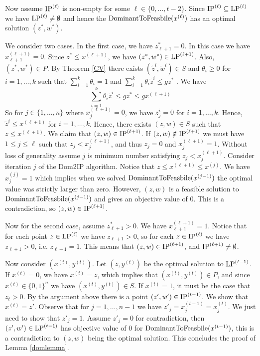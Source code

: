 	Now assume $\operatorname{IP}^{(\ell)}$ is non-empty for some $\ell \in \{0,\ldots,t-2\}$. Since $\operatorname{IP}^{(\ell)}\subseteq\operatorname{LP}^{(\ell)}$ we have $\operatorname{LP}^{(\ell)}\neq \emptyset$ and hence the $\operatorname{DominantToFeasbile}(x^{(\ell)})$ has an optimal solution $(z^*,w^*)$. 
	
	We consider two cases. In the first case, we have $z^*_{\ell+1}=0$. In this case we have $x^{(\ell+1)}_{\ell+1}=0$. Since $z^*\leq x^{(\ell+1)}$, we have $(z^*,w^*)\in \operatorname{LP}^{(\ell+1)}$. Also, $(z^*,w^*)\in P$. By Theorem \ref{CV} there exists $(\tilde{z}^i,\tilde{w}^i)\in S$ and $\theta_i\geq 0$ for $i=1,\ldots,k$ such that $\sum_{i=1}^{k} \theta_i = 1$ and  $\sum_{i=1}^{k}\theta_i \tilde{z}^i \leq gz^*$ . We have
	\begin{equation}
	\sum_{i=1}^{k}\theta_i \tilde{z}^i \leq gz^*\leq gx^{(\ell+1)}
	\end{equation}
	So for $j\in \{1,\ldots,n\}$ where $x^{(\ell+1)}_j=0$, we have $z^i_j=0$ for $i=1,\ldots,k$. Hence, $\tilde{z}^i\leq x^{(\ell+1)}$ for $i=1,\ldots,k$. Hence, there exists $(z,w)\in S$ such that $z\leq x^{(\ell+1)}$. We claim that $(z,w)\in \operatorname{IP}^{(\ell+1)}$. If $(z,w)\notin \operatorname{IP}^{(\ell+1)}$ we must have $1\leq j \leq \ell$ such that $z_j < x^{(\ell+1)}_{j}$, and thus $z_j = 0$ and $x^{(\ell+1)}_j=1$. Without loss of generality assume $j$ is minimum number satisfying $z_j < x^{(\ell+1)}_{j}$. Consider iteration $j$ of the Dom2IP algorithm. Notice that $z\leq x^{(\ell+1)}\leq x^{(j)}$. We have $x^{(j)}_j=1$ which implies when we solved $\operatorname{DominantToFeasbile}(x^{(j-1)})$ the optimal value was strictly larger than zero. However, $(z,w)$ is a feasible solution to $\operatorname{DominantToFeasbile}(x^{(j-1)})$ and gives an objective value of 0. This is a contradiction, so $(z,w)\in \operatorname{IP}^{(\ell+1)}$.
	
	Now for the second case, assume $z^*_{\ell+1} > 0$. We have $x^{(\ell+1)}_{\ell+1}=1$. Notice that for each point $z\in \operatorname{LP}^{(\ell)}$ we have $z_{\ell+1} >0$, so for each $z\in \operatorname{IP}^{(\ell)}$ we have $z_{\ell+1}>0$, i.e. $z_{\ell+1}=1$. This means that $(z,w)\in \operatorname{IP}^{(\ell+1)}$, and $\operatorname{IP}^{(\ell+1)} \neq \emptyset$.
	
	Now consider $(x^{(t)},y^{(t)})$. Let $(z,y^{(t)})$ be the optimal solution to $\operatorname{LP}^{(t-1)}$. If $x^{(t)} = 0$, we have $x^{(t)} = z$, which implies that $(x^{(t)},y^{(t)})\in P$, and since $x^{(t)}\in \{0,1\}^n$ we have $(x^{(t)},y^{(t)})\in S$. If $x^{(t)} =1$, it must be the case that $z_t > 0$. By the argument above there is a point $(z',w')\in \operatorname{IP}^{(t-1)}$. We show that $x^{(t)} = z'$. Observe that for $j=1,\ldots,n-1$ we have $z'_j= x_j^{(t-1)}=x_j^{(t)}$. We just need to show that $z'_j = 1$. Assume $z'_j = 0$ for contradiction, then $(z',w')\in \operatorname{LP}^{(t-1)}$ has objective value of $0$ for $\operatorname{DominantToFeasbile}(x^{(t-1)})$, this is a contradiction to $(z,w)$ being the optimal solution. This concludes the proof of Lemma \ref{domlemma}. 
	
